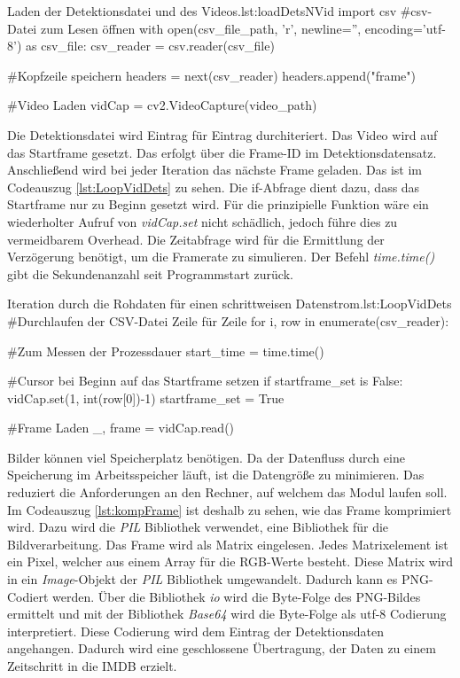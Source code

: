 \begin{pythoncode}{Laden der Detektionsdatei und des Videos.}{lst:loadDetsNVid}
import csv
#csv-Datei zum Lesen öffnen 
with open(csv_file_path, 'r', newline='', encoding='utf-8') as csv_file:
    csv_reader = csv.reader(csv_file)

    #Kopfzeile speichern
    headers = next(csv_reader)
    headers.append("frame")

    #Video Laden
    vidCap = cv2.VideoCapture(video_path)
\end{pythoncode}

Die Detektionsdatei wird Eintrag für Eintrag durchiteriert. Das Video wird auf das Startframe gesetzt. Das erfolgt über die Frame-ID im Detektionsdatensatz. Anschließend wird bei jeder Iteration das nächste Frame geladen. Das ist im Codeauszug \ref{lst:LoopVidDets} zu sehen. Die if-Abfrage dient dazu, dass das Startframe nur zu Beginn gesetzt wird. Für die prinzipielle Funktion wäre ein wiederholter Aufruf von \textit{vidCap.set} nicht schädlich, jedoch führe dies zu vermeidbarem Overhead. Die Zeitabfrage wird für die Ermittlung der Verzögerung benötigt, um die Framerate zu simulieren. Der Befehl \textit{time.time()} gibt die Sekundenanzahl seit Programmstart zurück.


\begin{pythoncode}{Iteration durch die Rohdaten für einen schrittweisen Datenstrom.}{lst:LoopVidDets}
#Durchlaufen der CSV-Datei Zeile für Zeile
for i, row in enumerate(csv_reader):

    #Zum Messen der Prozessdauer
    start_time = time.time()
    
    #Cursor bei Beginn auf das Startframe setzen
    if startframe_set is False:
        vidCap.set(1, int(row[0])-1)
        startframe_set = True

    #Frame Laden                          
    _, frame = vidCap.read()
\end{pythoncode}

Bilder können viel Speicherplatz benötigen. Da der Datenfluss durch eine Speicherung im Arbeitsspeicher läuft, ist die Datengröße zu minimieren. Das reduziert die Anforderungen an den Rechner, auf welchem das Modul laufen soll. Im Codeauszug \ref{lst:kompFrame} ist deshalb zu sehen, wie das Frame komprimiert wird. Dazu wird die \textit{PIL} Bibliothek verwendet, eine Bibliothek für die Bildverarbeitung. Das Frame wird als Matrix eingelesen. Jedes Matrixelement ist ein Pixel, welcher aus einem Array für die RGB-Werte  besteht. Diese Matrix wird in ein \textit{Image}-Objekt der \textit{PIL} Bibliothek umgewandelt. Dadurch kann es PNG-Codiert werden. Über die Bibliothek \textit{io} wird die Byte-Folge des PNG-Bildes ermittelt und mit der Bibliothek \textit{Base64} wird die Byte-Folge als utf-8 Codierung interpretiert. Diese Codierung wird dem Eintrag der Detektionsdaten angehangen. Dadurch wird eine geschlossene Übertragung, der Daten zu einem Zeitschritt in die IMDB erzielt.

